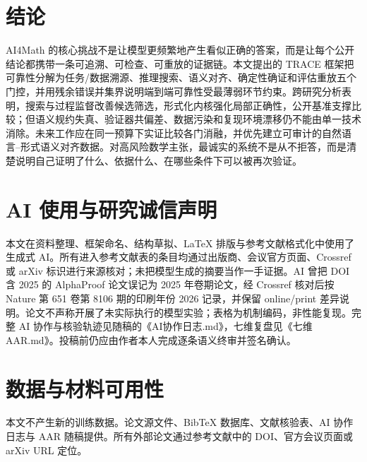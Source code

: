 \documentclass[UTF8,11pt,a4paper,fontset=fandol]{ctexart}
\newcommand{\trace}{\textsf{TRACE}}
\begin{document}
\section{结论}
AI4Math 的核心挑战不是让模型更频繁地产生看似正确的答案，而是让每个公开结论都携带一条可追溯、可检查、可重放的证据链。本文提出的 \trace{} 框架把可靠性分解为任务/数据溯源、推理搜索、语义对齐、确定性确证和评估重放五个门控，并用残余错误并集界说明端到端可靠性受最薄弱环节约束。跨研究分析表明，搜索与过程监督改善候选筛选，形式化内核强化局部正确性，公开基准支撑比较；但语义规约失真、验证器共偏差、数据污染和复现环境漂移仍不能由单一技术消除。未来工作应在同一预算下实证比较各门消融，并优先建立可审计的自然语言--形式语义对齐数据。对高风险数学主张，最诚实的系统不是从不拒答，而是清楚说明自己证明了什么、依据什么、在哪些条件下可以被再次验证。

\section*{AI 使用与研究诚信声明}
本文在资料整理、框架命名、结构草拟、LaTeX 排版与参考文献格式化中使用了生成式 AI。所有进入参考文献表的条目均通过出版商、会议官方页面、Crossref 或 arXiv 标识进行来源核对；未把模型生成的摘要当作一手证据。AI 曾把 DOI 含 2025 的 AlphaProof 论文误记为 2025 年卷期论文，经 Crossref 核对后按 Nature 第 651 卷第 8106 期的印刷年份 2026 记录，并保留 online/print 差异说明。论文不声称开展了未实际执行的模型实验；表格为机制编码，非性能复现。完整 AI 协作与核验轨迹见随稿的《AI协作日志.md》，七维复盘见《七维AAR.md》。投稿前仍应由作者本人完成逐条语义终审并签名确认。

\section*{数据与材料可用性}
本文不产生新的训练数据。论文源文件、BibTeX 数据库、文献核验表、AI 协作日志与 AAR 随稿提供。所有外部论文通过参考文献中的 DOI、官方会议页面或 arXiv URL 定位。




\appendix
\end{document}
